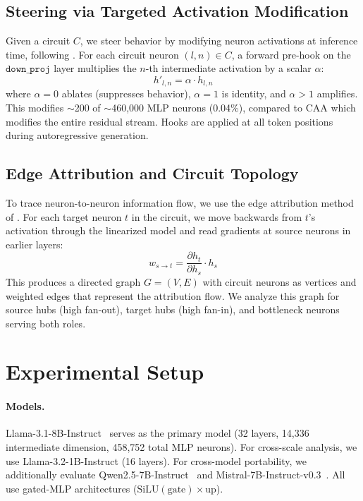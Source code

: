 \documentclass[11pt]{article}
\begin{document}
\subsection{Steering via Targeted Activation Modification}
\label{sec:steering}

Given a circuit $C$, we steer behavior by modifying neuron activations at inference time, following \citet{arora2025circuits}.
For each circuit neuron $(l, n) \in C$, a forward pre-hook on the $\texttt{down\_proj}$ layer multiplies the $n$-th intermediate activation by a scalar $\alpha$:
\begin{equation}
    h'_{l,n} = \alpha \cdot h_{l,n}
\end{equation}
where $\alpha = 0$ ablates (suppresses behavior), $\alpha = 1$ is identity, and $\alpha > 1$ amplifies.
This modifies ${\sim}$200 of ${\sim}$460,000 MLP neurons (0.04\%), compared to CAA which modifies the entire residual stream.
Hooks are applied at all token positions during autoregressive generation.

\subsection{Edge Attribution and Circuit Topology}
\label{sec:edges}

To trace neuron-to-neuron information flow, we use the edge attribution method of \citet{arora2025circuits}.
For each target neuron $t$ in the circuit, we move backwards from $t$'s activation through the linearized model and read gradients at source neurons in earlier layers:
\begin{equation}
    w_{s \to t} = \frac{\partial h_t}{\partial h_s} \cdot h_s
\end{equation}
This produces a directed graph $G = (V, E)$ with circuit neurons as vertices and weighted edges that represent the attribution flow.
We analyze this graph for source hubs (high fan-out), target hubs (high fan-in), and bottleneck neurons serving both roles.


\section{Experimental Setup}
\label{sec:setup}

\paragraph{Models.}
Llama-3.1-8B-Instruct~\citep{dubey2024llama3} serves as the primary model (32 layers, 14,336 intermediate dimension, 458,752 total MLP neurons).
For cross-scale analysis, we use Llama-3.2-1B-Instruct (16 layers).
For cross-model portability, we additionally evaluate Qwen2.5-7B-Instruct~\citep{yang2024qwen2} and Mistral-7B-Instruct-v0.3~\citep{jiang2023mistral}.
All use gated-MLP architectures ($\text{SiLU}(\text{gate}) \times \text{up}$).
\end{document}
